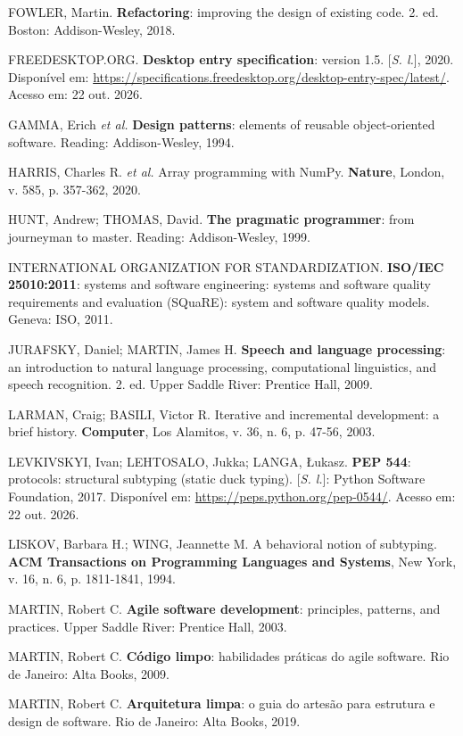 FOWLER, Martin. \textbf{Refactoring}: improving the design of existing code. 2. ed. Boston:
Addison-Wesley, 2018.

FREEDESKTOP.ORG. \textbf{Desktop entry specification}: version 1.5. [\textit{S. l.}], 2020.
Disponível em: \url{https://specifications.freedesktop.org/desktop-entry-spec/latest/}. Acesso em:
22 out. 2026.

GAMMA, Erich \textit{et al.} \textbf{Design patterns}: elements of reusable object-oriented software.
Reading: Addison-Wesley, 1994.

HARRIS, Charles R. \textit{et al.} Array programming with NumPy. \textbf{Nature}, London, v. 585,
p. 357-362, 2020.

HUNT, Andrew; THOMAS, David. \textbf{The pragmatic programmer}: from journeyman to master. Reading:
Addison-Wesley, 1999.

INTERNATIONAL ORGANIZATION FOR STANDARDIZATION. \textbf{ISO/IEC 25010:2011}: systems and software
engineering: systems and software quality requirements and evaluation (SQuaRE): system and software
quality models. Geneva: ISO, 2011.

JURAFSKY, Daniel; MARTIN, James H. \textbf{Speech and language processing}: an introduction to natural
language processing, computational linguistics, and speech recognition. 2. ed. Upper Saddle River:
Prentice Hall, 2009.

LARMAN, Craig; BASILI, Victor R. Iterative and incremental development: a brief history.
\textbf{Computer}, Los Alamitos, v. 36, n. 6, p. 47-56, 2003.

LEVKIVSKYI, Ivan; LEHTOSALO, Jukka; LANGA, Łukasz. \textbf{PEP 544}: protocols: structural subtyping
(static duck typing). [\textit{S. l.}]: Python Software Foundation, 2017. Disponível em:
\url{https://peps.python.org/pep-0544/}. Acesso em: 22 out. 2026.

LISKOV, Barbara H.; WING, Jeannette M. A behavioral notion of subtyping. \textbf{ACM Transactions on
Programming Languages and Systems}, New York, v. 16, n. 6, p. 1811-1841, 1994.

MARTIN, Robert C. \textbf{Agile software development}: principles, patterns, and practices. Upper
Saddle River: Prentice Hall, 2003.

MARTIN, Robert C. \textbf{Código limpo}: habilidades práticas do agile software. Rio de Janeiro: Alta
Books, 2009.

MARTIN, Robert C. \textbf{Arquitetura limpa}: o guia do artesão para estrutura e design de software.
Rio de Janeiro: Alta Books, 2019.

